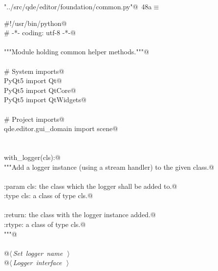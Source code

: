 \documentclass[
    a4paper,      %
    10pt,         %
    openright,    %
    notitlepage,  %
    parskip=half, %
]{scrreprt}       %
\theoremstyle{definition}                    %
\begin{document}
\begin{flushleft} \small
\begin{minipage}{\linewidth}\label{scrap58}\raggedright\small
{} \verb@"../src/qde/editor/foundation/common.py"@\nobreak\ {\footnotesize {48a}}$\equiv$
\vspace{-1ex}
\begin{list}{}{} \item
\mbox{}\lstinline@#!/usr/bin/python@\\
\mbox{}\lstinline@# -*- coding: utf-8 -*-@\\
\mbox{}\lstinline@@\\
\mbox{}\lstinline@"""Module holding common helper methods."""@\\
\mbox{}\lstinline@@\\
\mbox{}\lstinline@# System imports@\\
\mbox{}\lstinline@from PyQt5 import Qt@\\
\mbox{}\lstinline@from PyQt5 import QtCore@\\
\mbox{}\lstinline@from PyQt5 import QtWidgets@\\
\mbox{}\lstinline@@\\
\mbox{}\lstinline@# Project imports@\\
\mbox{}\lstinline@from qde.editor.gui_domain import scene@\\
\mbox{}\lstinline@@\\
\mbox{}\lstinline@@\\
\mbox{}\lstinline@def with_logger(cls):@\\
\mbox{}\lstinline@    """Add a logger instance (using a stream handler) to the given class.@\\
\mbox{}\lstinline@@\\
\mbox{}\lstinline@    :param cls: the class which the logger shall be added to.@\\
\mbox{}\lstinline@    :type  cls: a class of type cls.@\\
\mbox{}\lstinline@@\\
\mbox{}\lstinline@    :return: the class with the logger instance added.@\\
\mbox{}\lstinline@    :rtype:  a class of type cls.@\\
\mbox{}\lstinline@    """@\\
\mbox{}\lstinline@@\\
\mbox{}\lstinline@    @\hbox{$\langle\,${\itshape Set logger name}\nobreak\ {\footnotesize {}}$\,\rangle$}\lstinline@@\\
\mbox{}\lstinline@    @\hbox{$\langle\,${\itshape Logger interface}\nobreak\ {\footnotesize {}}$\,\rangle$}\lstinline@@\\
\mbox{}\lstinline@@{\NWsep}
\end{list}
\vspace{-1.5ex}
\footnotesize
\begin{list}{}{\setlength{\itemsep}{-\parsep}\setlength{\itemindent}{-\leftmargin}}

\item{}
\end{list}
\end{minipage}\vspace{4ex}
\end{flushleft}
\end{document}
